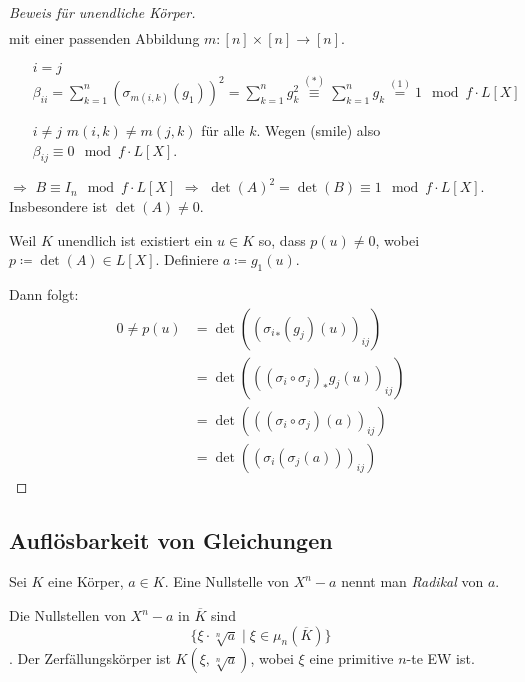 \documentclass[../main.tex]{subfiles}
\begin{document}
\begin{proof} [Beweis für unendliche Körper]
\begin{align*}
    \end{align*}
    mit einer passenden Abbildung $m\colon [n]\times [n] \rightarrow [n]$.
    \begin{itemize}
        \item[$i=j$]
        $\beta_{ii} = \sum_{k=1}^n \left(\sigma_{m(i,k)}(g_1)\right)^2 =\sum_{k=1}^n g_k^2\overset{(*)}{\equiv} \sum_{k=1}^n g_k \overset{(1)}{=} 1 \mod f\cdot L[X] $
        \item[$i\neq j$]
        $m(i,k) \neq m(j,k)$ für alle $k$.
        Wegen (smile) also $\beta_{ij}\equiv 0\mod f\cdot L[X]$.
    \end{itemize}

    $\Rightarrow$ $B\equiv I_n\mod f\cdot L[X]$
    $\Rightarrow$ $\det(A)^2 = \det(B)\equiv 1 \mod f\cdot L[X]$.
    Insbesondere ist $\det(A)\neq 0$.

    Weil $K$ unendlich ist existiert ein $u\in K$ so, dass $p(u)\neq 0$, wobei $p\coloneqq \det(A)\in L[X]$.
    Definiere $a\coloneqq g_1(u)$.

    Dann folgt:
    \begin{align*}
        0\neq p(u) &= \det\left(\left({\sigma_i}_*\left(g_j\right)(u)\right)_{ij}\right)\\
        &= \det\left(\left((\sigma_i\circ \sigma_j)_* g_j(u)\right)_{ij}\right)\\
        &= \det\left(\left((\sigma_i\circ \sigma_j)(a)\right)_{ij}\right)\\
        &= \det\left(\left(\sigma_i(\sigma_j(a))\right)_{ij}\right)
    \end{align*}
\end{proof}

\subsection{Auflösbarkeit von Gleichungen}
\begin{definition}
    Sei $K$ eine Körper, $a\in K$.
    Eine Nullstelle von $X^n-a$ nennt man \emph{Radikal} von $a$.
\end{definition}
Die Nullstellen von $X^n-a$ in $\overline{K}$ sind $$\{\xi\cdot \sqrt[n]{a}\mid \xi \in \mu_n(\overline{K})\}$$.
Der Zerfällungskörper ist $K(\xi,\sqrt[n]{a})$, wobei $\xi$ eine primitive $n$-te EW ist.
\end{document}
